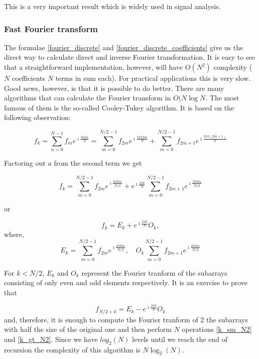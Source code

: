 \documentclass[11pt]{book}
\begin{document}
This is a very important result which is widely used in signal analysis. 

\subsubsection{Fast Fourier transform}

The formulae \eqref{fourier_discrete} and \eqref{fourier_discrete_coefficients} give us the direct way to calculate direct and inverse Fourier transformation. It is easy to see that a straightforward implementation, however, will have $O(N^2)$ complexity ( $N$ coefficients $N$ terms in sum each). For practical applications this is very slow. Good news, however, is that it is possible to do better. There are many algorithms that can calculate the Fourier transform in $O(N\operatorname{log}{N}$. The most famous of them is the so-called Cooley-Tukey algorithm. It is based on the following observation:


\begin{equation}
f_k = \sum\limits_{n=0}^{N-1} f_{m} e^{\imath \frac{2 \pi k n}{N}} = \sum\limits_{m=0}^{N/2 -1} f_{2m} e^{\imath \frac{2 \pi k 2 m}{N}} + \sum\limits_{m = 0}^{N / 2-1} f_{2m+1} e^{\imath \frac{2 \pi k (2 m + 1)}{N}}
\end{equation}

Factoring out $a$ from the second term we get

\begin{equation}
f_k =  \sum\limits_{m=0}^{N/2 -1} f_{2m} e^{\imath \frac{2 \pi k m}{N / 2}} + e^{\imath \frac{2 \pi k}{N}}\sum\limits_{m = 0}^{N / 2 - 1} f_{2m+1} e^{\imath \frac{2 \pi k m }{N / 2}}\label{split_fft_oe}
\end{equation}

or

\begin{equation}
 f_k = E_{k} + e^{\imath \frac{2 \pi k}{N}} O_k, \label{k_sm_N2}
\end{equation}
where,
\begin{equation}
 E_k=\sum\limits_{m=0}^{N/2 -1} f_{2m} e^{\imath \frac{2 \pi k m}{N / 2}},\quad O_k \sum\limits_{m = 0}^{N / 2 - 1} f_{2m+1} e^{\imath \frac{2 \pi k m }{N / 2}}
\end{equation}

For $k<N/2$, $E_k$ and $O_k$ represent the Fourier tranform of the subarrays consisting of only even and odd elements respectively.
It is an exercise to prove that

\begin{equation}
 f_{N/2+k} =  E_{k} - e^{\imath \frac{2 \pi k}{N}} O_k \label{k_gt_N2}
\end{equation}
and, therefore, it is enough to compute the Fourier tranform of 2 the subarrays with half the size of the original one and then perform $N$
operations \eqref{k_sm_N2} and \eqref{k_gt_N2}. Since we have $log_2(N)$ levels until we reach the end of recursion the complexity of this algorithm is $N\operatorname{log}_2(N)$.
\end{document}
